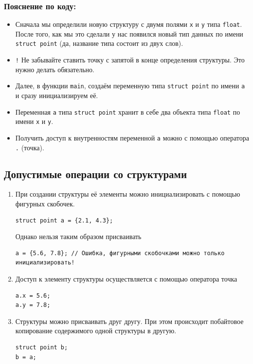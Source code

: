 \documentclass{article}
\begin{document}
\subsubsection*{Пояснение по коду:}
\begin{itemize}
\item Сначала мы определили новую структуру с двумя полями \texttt{x} и \texttt{y} типа \texttt{float}. После того, как мы это сделали у нас появился новый тип данных по имени \texttt{struct point} (да, название типа состоит из двух слов).
\item \texttt{!} Не забывайте ставить точку с запятой в конце определения структуры. Это нужно делать обязательно. 
\item Далее, в функции \texttt{main}, создаём переменную типа \texttt{struct point} по имени \texttt{a} и сразу инициализируем её.
\item Переменная \texttt{a} типа \texttt{struct point} хранит в себе два объекта типа \texttt{float} по имени \texttt{x} и \texttt{y}.
\item Получить доступ к внутренностям переменной \texttt{a} можно с помощью оператора \texttt{.} (точка).
\end{itemize}



\subsection*{Допустимые операции со структурами}
\begin{enumerate}
\item При создании структуры её элементы можно инициализировать с помощью фигурных скобочек.
\begin{lstlisting}
struct point a = {2.1, 4.3};
\end{lstlisting}
Однако нельзя таким образом присваивать
\begin{lstlisting}
a = {5.6, 7.8}; // Ошибка, фигурными скобочками можно только инициализировать!
\end{lstlisting}
\item Доступ к элементу структуры осуществляется с помощью оператора точка
\begin{lstlisting}
a.x = 5.6;
a.y = 7.8;
\end{lstlisting}
\item Структуры можно присваивать друг другу. При этом происходит побайтовое копирование содержимого одной структуры в другую.
\begin{lstlisting}
struct point b;
b = a;
\end{lstlisting}
\end{enumerate}
\end{document}
